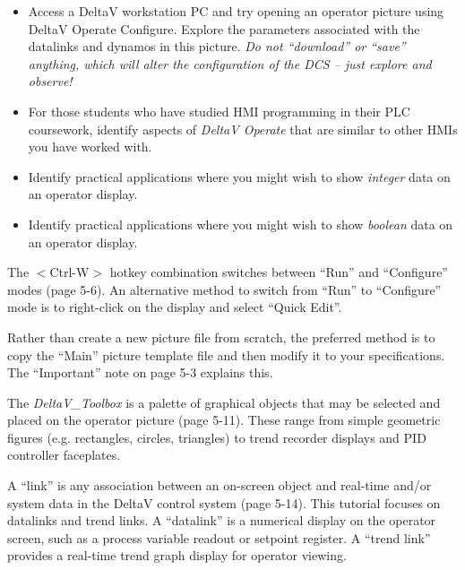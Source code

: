 \begin{itemize}
\item{} Access a DeltaV workstation PC and try opening an operator picture using DeltaV Operate Configure.  Explore the parameters associated with the datalinks and dynamos in this picture.  {\it Do not ``download'' or ``save'' anything, which will alter the configuration of the DCS -- just explore and observe!}
\item{} For those students who have studied HMI programming in their PLC coursework, identify aspects of {\it DeltaV Operate} that are similar to other HMIs you have worked with.
\item{} Identify practical applications where you might wish to show {\it integer} data on an operator display.
\item{} Identify practical applications where you might wish to show {\it boolean} data on an operator display.
\end{itemize}














The $<$Ctrl-W$>$ hotkey combination switches between ``Run'' and ``Configure'' modes (page 5-6).  An alternative method to switch from ``Run'' to ``Configure'' mode is to right-click on the display and select ``Quick Edit''.

\vskip 10pt

Rather than create a new picture file from scratch, the preferred method is to copy the ``Main'' picture template file and then modify it to your specifications.  The ``Important'' note on page 5-3 explains this.

\vskip 10pt

The {\it DeltaV\_Toolbox} is a palette of graphical objects that may be selected and placed on the operator picture (page 5-11).  These range from simple geometric figures (e.g. rectangles, circles, triangles) to trend recorder displays and PID controller faceplates.

\vskip 10pt

A ``link'' is any association between an on-screen object and real-time and/or system data in the DeltaV control system (page 5-14).  This tutorial focuses on datalinks and trend links.  A ``datalink'' is a numerical display on the operator screen, such as a process variable readout or setpoint register.  A ``trend link'' provides a real-time trend graph display for operator viewing.

